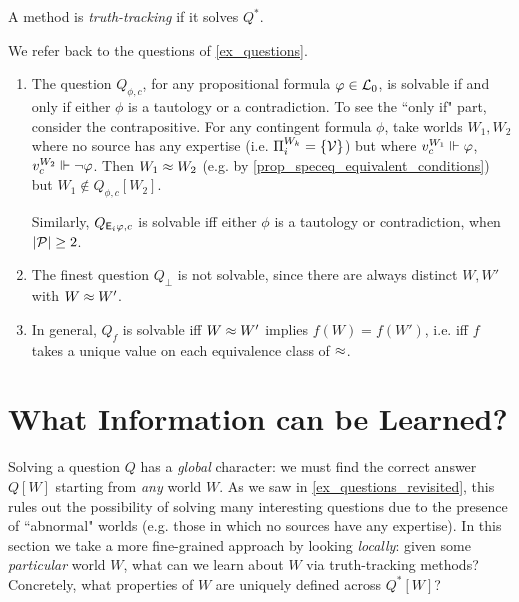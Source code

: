 \begin{definition}
    \label{def_truthtracking}
    A method is \emph{truth-tracking} if it solves $Q^*$.
\end{definition}

\begin{example}
    \label{ex_questions_revisited}
    We refer back to the questions of \cref{ex_questions}.
    \begin{enumerate}
        \item The question $Q_{\phi, c}$, for any propositional formula $\varphi
              \in \mathcal{L}_0$, is solvable if and only if either $\phi$ is a
              tautology or a contradiction. To see the ``only if" part,
              consider the contrapositive. For any contingent formula $\phi$,
              take worlds $W_1, W_2$ where no source has any expertise (i.e.
              $\Pi^{W_k}_i = \{\mathcal{V}\}$) but where $v^{W_1}_c \Vdash
              \varphi$, $v^{W_2}_c \Vdash \neg\varphi$. Then $W_1 \approx W_2$
              (e.g. by \cref{prop_speceq_equivalent_conditions}) but $W_1
              \notin Q_{\phi, c}[W_2]$.

              Similarly, $Q_{\mathsf{E}_i\varphi, c}$ is solvable iff either $\phi$ is a
              tautology or contradiction, when $|\mathcal{P}| \ge 2$.

        \item The finest question $Q_\bot$ is not solvable, since there are
              always distinct $W, W'$ with $W \approx W'$.

        \item In general, $Q_f$ is solvable iff $W \approx W'$ implies $f(W) =
            f(W')$, i.e. iff $f$ takes a unique value on each equivalence class
            of $\approx$.
    \end{enumerate}
\end{example}

\section{What Information can be Learned?}
\label{sec_learning_info}

Solving a question $Q$ has a \emph{global} character: we must find the correct
answer $Q[W]$ starting from \emph{any} world $W$. As we saw in
\cref{ex_questions_revisited}, this rules out the possibility of solving many
interesting questions due to the presence of ``abnormal" worlds (e.g. those in
which no sources have any expertise). In this section we take a more
fine-grained approach by looking \emph{locally}: given some \emph{particular}
world $W$, what can we learn about $W$ via truth-tracking methods?
Concretely, what properties of $W$ are uniquely defined across $Q^*[W]$?

